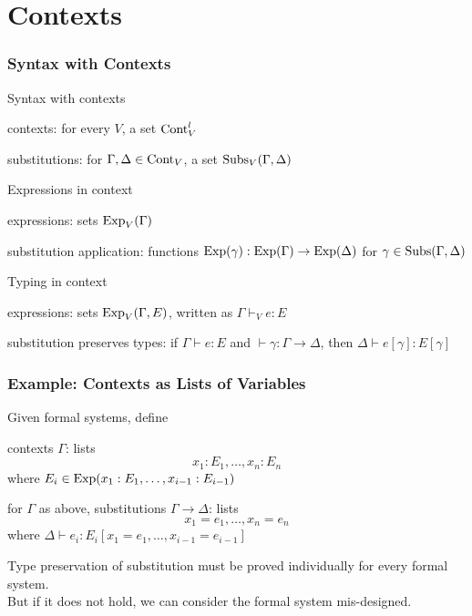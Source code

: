 \section{Contexts}

\begin{frame}\frametitle{Syntax with Contexts}
\begin{blockitems}{Syntax with contexts}
\item contexts: for every $V$, a set $\mathrm{Cont}^l_V$
\item substitutions: for $\Gamma,\Delta\in\mathrm{Cont}_V$, a set $\mathrm{Subs}_V(\Gamma,\Delta)$
\end{blockitems}

\begin{blockitems}{Expressions in context}
\item expressions: sets $\mathrm{Exp}_V(\Gamma)$
\item substitution application: functions $\mathrm{Exp}(\gamma):\mathrm{Exp}(\Gamma)\to\mathrm{Exp}(\Delta)$ for $\gamma\in\mathrm{Subs}(\Gamma,\Delta)$
\end{blockitems}

\begin{blockitems}{Typing in context}
\item expressions: sets $\mathrm{Exp}_V(\Gamma,E)$, written as $\Gamma\vdash_V e: E$
\item substitution preserves types: if $\Gamma\vdash e:E$ and $\vdash \gamma:\Gamma\to\Delta$, then $\Delta\vdash e[\gamma]:E[\gamma]$
\end{blockitems}
\end{frame}

\begin{frame}\frametitle{Example: Contexts as Lists of Variables}
\begin{blockitems}{Given formal systems, define}
\item contexts $\Gamma$: lists \[x_1:E_1,\ldots,x_n:E_n\]
 where $E_i\in\mathrm{Exp}(x_1:E_1,\ldots,x_{i-1}:E_{i-1})$
\item for $\Gamma$ as above, substitutions $\Gamma\to \Delta$: lists \[x_1=e_1,\ldots,x_n=e_n\]
 where $\Delta\vdash e_i: E_i[x_1=e_1,\ldots,x_{i-1}=e_{i-1}]$
\end{blockitems}

Type preservation of substitution must be proved individually for every formal system.\\
But if it does not hold, we can consider the formal system mis-designed.
\end{frame}

